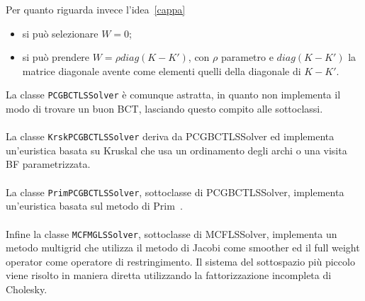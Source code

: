 Per quanto riguarda invece l'idea~\eqref{cappa}
\begin{itemize}
\item si può selezionare $W=0$;
\item si può prendere $W = \rho diag(K -K')$, con $\rho$ parametro e $diag(K-K')$ la matrice diagonale avente come elementi quelli della diagonale di $K-K'$.
\end{itemize}

La classe \texttt{PCGBCTLSSolver} è comunque astratta, in quanto non implementa il modo di trovare un buon BCT, lasciando questo compito alle sottoclassi.\\
\\
La classe \texttt{KrskPCGBCTLSSolver} deriva da PCGBCTLSSolver ed implementa un'euristica basata su Kruskal che usa un ordinamento degli archi o una visita BF parametrizzata.\\
\\
La classe \texttt{PrimPCGBCTLSSolver}, sottoclasse di PCGBCTLSSolver, implementa un'euristica basata sul metodo di Prim~\cite{Prim_frangio}.\\
\\
Infine la classe \texttt{MCFMGLSSolver}, sottoclasse di MCFLSSolver, implementa un metodo multigrid che utilizza il metodo di Jacobi come smoother ed il full weight operator come operatore di restringimento.
Il sistema del sottospazio più piccolo viene risolto in maniera diretta utilizzando la fattorizzazione incompleta di Cholesky.